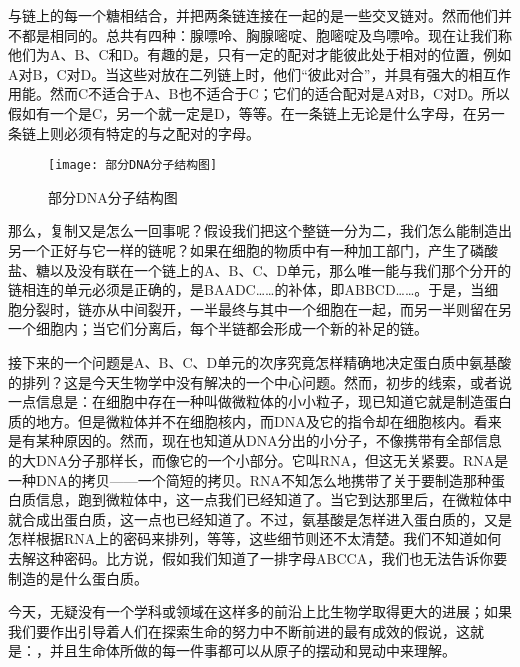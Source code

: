 \documentclass[12pt,oneside]{book}
\begin{document}
与链上的每一个糖相结合，并把两条链连接在一起的是一些交叉链对。然而他们并不都是相同的。总共有四种：腺嘌呤、胸腺嘧啶、胞嘧啶及鸟嘌呤。现在让我们称他们为A、B、C和D。有趣的是，只有一定的配对才能彼此处于相对的位置，例如A对B，C对D。当这些对放在二列链上时，他们“彼此对合”，并具有强大的相互作用能。然而C不适合于A、B也不适合于C；它们的适合配对是A对B，C对D。所以假如有一个是C，另一个就一定是D，等等。在一条链上无论是什么字母，在另一条链上则必须有特定的与之配对的字母。

\begin{wrapfigure}{l}{0.5\textwidth}
\texttt{[image: 部分DNA分子结构图]}
\caption{部分DNA分子结构图}
\label{fig:部分DNA分子结构图}
\end{wrapfigure}

那么，复制又是怎么一回事呢？假设我们把这个整链一分为二，我们怎么能制造出另一个正好与它一样的链呢？如果在细胞的物质中有一种加工部门，产生了磷酸盐、糖以及没有联在一个链上的A、B、C、D单元，那么唯一能与我们那个分开的链相连的单元必须是正确的，是BAADC……的补体，即ABBCD……。于是，当细胞分裂时，链亦从中间裂开，一半最终与其中一个细胞在一起，而另一半则留在另一个细胞内；当它们分离后，每个半链都会形成一个新的补足的链。


接下来的一个问题是A、B、C、D单元的次序究竟怎样精确地决定蛋白质中氨基酸的排列？这是今天生物学中没有解决的一个中心问题。然而，初步的线索，或者说一点信息是：在细胞中存在一种叫做微粒体的小小粒子，现已知道它就是制造蛋白质的地方。但是微粒体并不在细胞核内，而DNA及它的指令却在细胞核内。看来是有某种原因的。然而，现在也知道从DNA分出的小分子，不像携带有全部信息的大DNA分子那样长，而像它的一个小部分。它叫RNA，但这无关紧要。RNA是一种DNA的拷贝——一个简短的拷贝。RNA不知怎么地携带了关于要制造那种蛋白质信息，跑到微粒体中，这一点我们已经知道了。当它到达那里后，在微粒体中就合成出蛋白质，这一点也已经知道了。不过，氨基酸是怎样进入蛋白质的，又是怎样根据RNA上的密码来排列，等等，这些细节则还不太清楚。我们不知道如何去解这种密码。比方说，假如我们知道了一排字母ABCCA，我们也无法告诉你要制造的是什么蛋白质。


今天，无疑没有一个学科或领域在这样多的前沿上比生物学取得更大的进展；如果我们要作出引导着人们在探索生命的努力中不断前进的最有成效的假说，这就是：，并且生命体所做的每一件事都可以从原子的摆动和晃动中来理解。
\end{document}

